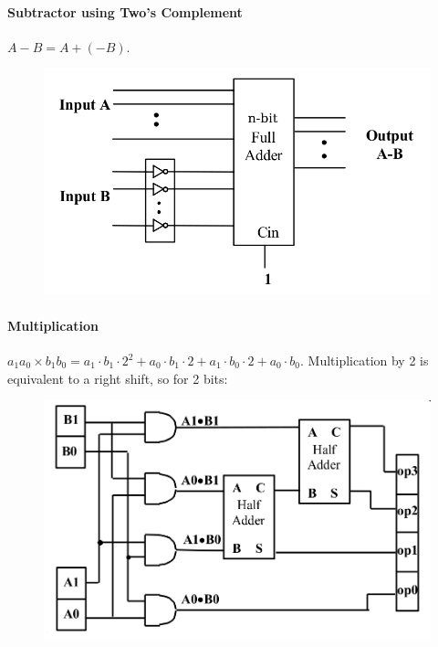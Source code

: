 \documentclass[twocolumn,english]{article}
\begin{document}
\paragraph{Subtractor using Two's Complement}

$A-B=A+\left(-B\right)$.

\begin{figure}[H]
\noindent \centering{}\includegraphics[width=0.2\paperwidth]{img/twocomplement-sub}
\end{figure}



\paragraph{Multiplication}

$a_{1}a_{0}\times b_{1}b_{0}=a_{1}\cdot b_{1}\cdot2^{2}+a_{0}\cdot b_{1}\cdot2+a_{1}\cdot b_{0}\cdot2+a_{0}\cdot b_{0}$.
Multiplication by 2 is equivalent to a right shift, so for 2 bits:

\begin{figure}[H]
\noindent \centering{}\includegraphics[width=0.25\paperwidth]{img/multiply2}
\end{figure}
\end{document}
